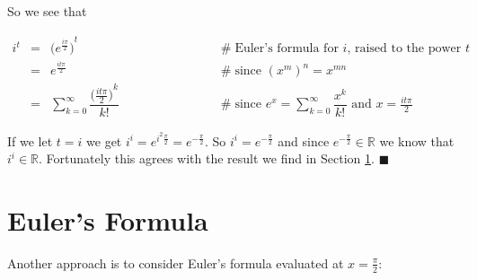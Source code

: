 \documentclass{article}
\theoremstyle{definition}
\begin{document}
\bigskip
\noindent
So we see that

\medskip
\begin{equation*}
\begin{array}{llll}
i^t 
&=& {\big ( e^{\frac{i\pi}{2}} \big )}^t 
		&\hspace{7em} \mathrel{\#} \text{Euler's formula for $i$, 
		raised to the power $t$}\\
[8pt]
&=& e^{\frac{it\pi}{2}}
		&\hspace{7em} \mathrel{\#} \text{since ${(x^m)}^{n} = x^{mn}$} \\
&=& \sum\limits_{k=0}^{\infty} \dfrac{{\big (\frac{it\pi}{2} \big )}^k}{k!}
		&\hspace{7em} \mathrel{\#} \text{since $e^x = \sum\limits_{k=0}^{\infty} \dfrac{x^k}{k!}$ 
		and $x = \frac{it\pi}{2}$} 

\end{array}
\end{equation*}

\bigskip
\noindent
If we let $t = i$ we get $i^i = e^{i^2 \frac{\pi}{2}} =
e^{-\frac{\pi}{2}}$. So $i^i = e^{-\frac{\pi}{2}}$ and since
$e^{-\frac{\pi}{2}} \in \mathbb{R}$ we know that $i^i \in
\mathbb{R}$. Fortunately this agrees with the result we find 
in Section \ref{sec:eulers_formula}. $\blacksquare$


\section{Euler's Formula}
\label{sec:eulers_formula}

\noindent
Another approach is to consider Euler's 
formula evaluated at $x =\frac{\pi}{2}$: 
\end{document}
